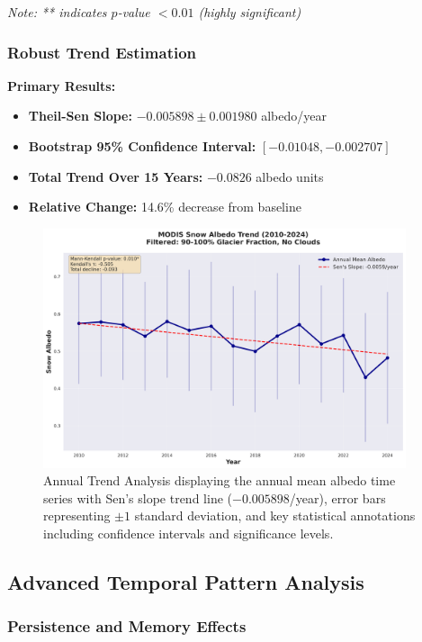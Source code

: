\documentclass[12pt,a4paper]{article}
\newcommand{\pvalue}{$p$-value}
\begin{document}
\textit{Note: ** indicates \pvalue{} $< 0.01$ (highly significant)}

\subsubsection{Robust Trend Estimation}

\textbf{Primary Results:}
\begin{itemize}
    \item \textbf{Theil-Sen Slope:} $-0.005898 \pm 0.001980$ albedo/year
    \item \textbf{Bootstrap 95\% Confidence Interval:} $[-0.01048, -0.002707]$
    \item \textbf{Total Trend Over 15 Years:} $-0.0826$ albedo units
    \item \textbf{Relative Change:} 14.6\% decrease from baseline
\end{itemize}

\begin{figure}[H]
\centering
\includegraphics[width=0.95\textwidth]{plots/annual_trend.png}
\caption{Annual Trend Analysis displaying the annual mean albedo time series with Sen's slope trend line ($-0.005898$/year), error bars representing $\pm 1$ standard deviation, and key statistical annotations including confidence intervals and significance levels.}
\label{fig:annual_trend}
\end{figure}

\subsection{Advanced Temporal Pattern Analysis}

\subsubsection{Persistence and Memory Effects}
\end{document}
